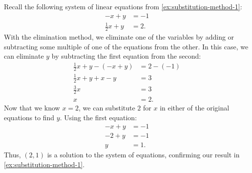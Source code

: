 \documentclass{article}
\begin{document}
\begin{example}\label{ex:elimination-method-1}
    Recall the following system of linear equations from \cref{ex:substitution-method-1}:
\begin{align*}
    -x+y&=-1 \\
    \frac{1}{2}x+y&=2.
\end{align*}
With the elimination method, we eliminate one of the variables by adding or subtracting some multiple of one of the equations from the other. In this case, we can eliminate \(y\) by subtracting the first equation from the second:
\begin{align*}
    \frac{1}{2}x+y-(-x+y)&=2-(-1) \\
    \frac{1}{2}x+y+x-y&=3 \\
    \frac{3}{2}x&=3 \\
    x&=2.
\end{align*}
Now that we know \(x=2\), we can substitute \(2\) for \(x\) in either of the original equations to find \(y\). Using the first equation:
\begin{align*}
    -x+y&=-1 \\
    -2+y&=-1 \\
    y&=1.
\end{align*}
Thus, \((2, 1)\) is a solution to the system of equations, confirming our result in \cref{ex:substitution-method-1}.
\end{example}
\end{document}
